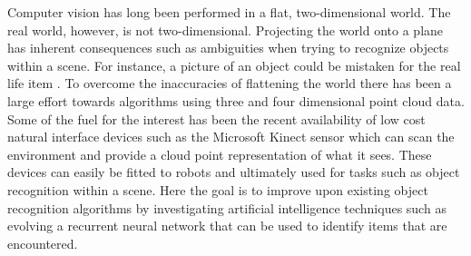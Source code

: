 Computer vision has long been performed in a flat, two-dimensional world. The real world, however, is not two-dimensional. Projecting the world onto a plane has inherent consequences such as ambiguities when trying to recognize objects within a scene. For instance, a picture of an object could be mistaken for the real life item \cite{Rusu2012}. To overcome the inaccuracies of flattening the world there has been a large effort towards algorithms using three and four dimensional point cloud data. Some of the fuel for the interest has been the recent availability of low cost natural interface devices such as the Microsoft Kinect sensor which can scan the environment and provide a cloud point representation of what it sees. These devices can easily be fitted to robots and ultimately used for tasks such as object recognition within a scene. Here the goal is to improve upon existing object recognition algorithms by investigating artificial intelligence techniques such as evolving a recurrent neural network that can be used to identify items that are encountered. 